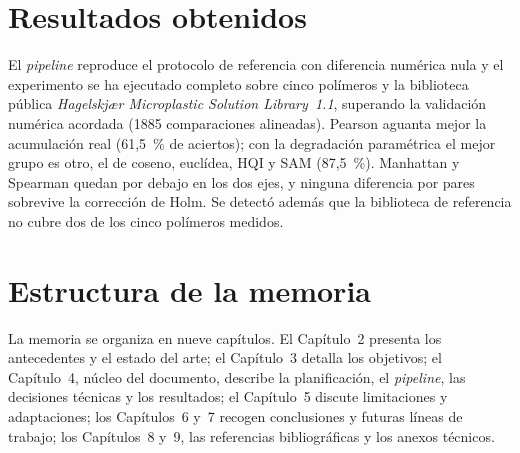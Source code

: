 \section{Resultados obtenidos}

El \textit{pipeline} reproduce el protocolo de referencia con diferencia numérica nula y el experimento se ha ejecutado completo sobre cinco polímeros y la biblioteca pública \emph{Hagelskjær Microplastic Solution Library~1.1}, superando la validación numérica acordada (1885 comparaciones alineadas). Pearson aguanta mejor la acumulación real (61,5~\% de aciertos); con la degradación paramétrica el mejor grupo es otro, el de coseno, euclídea, HQI y SAM (87,5~\%). Manhattan y Spearman quedan por debajo en los dos ejes, y ninguna diferencia por pares sobrevive la corrección de Holm. Se detectó además que la biblioteca de referencia no cubre dos de los cinco polímeros medidos.

\section{Estructura de la memoria}

La memoria se organiza en nueve capítulos. El Capítulo~2 presenta los antecedentes y el estado del arte; el Capítulo~3 detalla los objetivos; el Capítulo~4, núcleo del documento, describe la planificación, el \textit{pipeline}, las decisiones técnicas y los resultados; el Capítulo~5 discute limitaciones y adaptaciones; los Capítulos~6 y~7 recogen conclusiones y futuras líneas de trabajo; los Capítulos~8 y~9, las referencias bibliográficas y los anexos técnicos.
